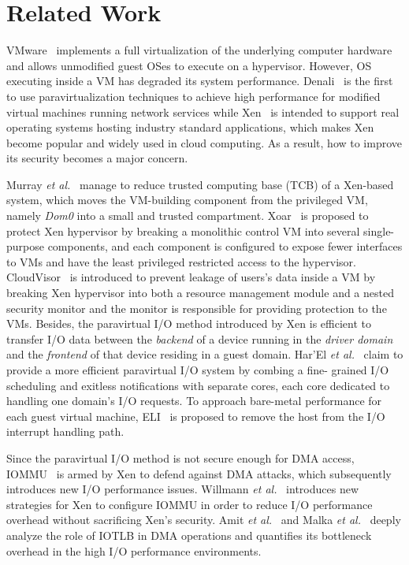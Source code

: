 \section{Related Work} \label{sec:rel}
VMware~\cite{devine2002virtualization} implements a full virtualization of the underlying computer hardware and allows unmodified guest OSes to execute on a hypervisor. However, OS executing inside a VM has degraded its system performance. Denali~\cite{whitaker2002scale} is the first to use paravirtualization techniques to achieve high performance for modified virtual machines running network services while Xen~\cite{barham2003xen} is intended to support real operating systems hosting industry standard applications, which makes Xen become popular and widely used in cloud computing. As a result, how to improve its security becomes a major concern.

Murray \emph{et al.}~\cite{disaggregation} manage to reduce trusted computing base (TCB) of a Xen-based system, which moves the VM-building component from the privileged VM, namely \emph{Dom0} into a small and trusted compartment.
Xoar~\cite{colp2011breaking} is proposed to protect Xen hypervisor by breaking a monolithic control VM into several single-purpose components, and each component is configured to expose fewer interfaces to VMs and have the least privileged restricted access to the hypervisor. CloudVisor~\cite{zhang2011cloudvisor} is introduced to prevent leakage of users's data inside a VM by breaking Xen hypervisor into both a resource management module and a nested security monitor and the monitor is responsible for providing protection to the VMs.
Besides, the paravirtual I/O method introduced by Xen is efficient to transfer I/O data between the \emph{backend} of a device running in the \emph{driver domain} and the \emph{frontend} of that device residing in a guest domain. Har'El \emph{et al.}~\cite{har2013efficient} claim to provide a more efficient paravirtual I/O system by combing a fine- grained I/O scheduling and exitless notifications with separate cores, each core dedicated to handling one domain's I/O requests. To approach bare-metal performance for each guest virtual machine, ELI~\cite{eli} is proposed to remove the host from the I/O interrupt handling path.

Since the paravirtual I/O method is not secure enough for DMA access, IOMMU~\cite{intelvt,amdvt} is armed by Xen to defend against DMA attacks, which subsequently introduces new I/O performance issues. Willmann \emph{et al.}~\cite{willmann2008protection} introduces new strategies for Xen to configure IOMMU in order to reduce I/O performance overhead without sacrificing Xen's security. Amit \emph{et al.}~\cite{amit2012iommu} and Malka \emph{et al.}~\cite{malka2015riommu} deeply analyze the role of IOTLB in DMA operations and quantifies its bottleneck overhead in the high I/O performance environments.

